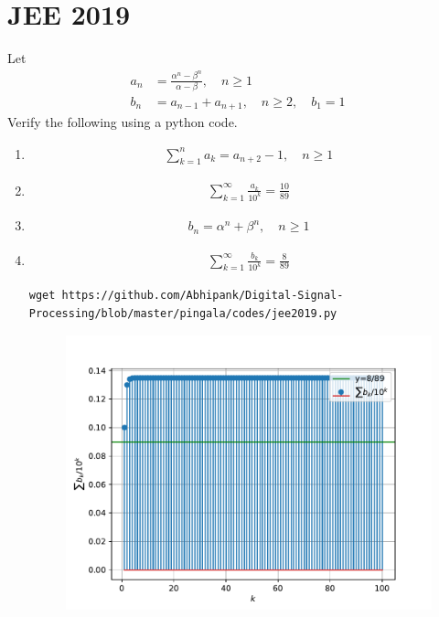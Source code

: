 \documentclass[journal,12pt,twocolumn]{IEEEtran}
\renewcommand\thesection{\arabic{section}}
\begin{document}
\section{JEE 2019}
Let 
\begin{align}
	a_n &= \frac{\alpha^{n}-\beta^{n}}{\alpha - \beta}, \quad n \ge 1
	\\
	b_n &= a_{n-1} + a_{n+1}, \quad n \ge 2, \quad b_1 =1
	\label{eq:10-orig-diff}
\end{align}
Verify the following using a python code.
\begin{enumerate}[label=\thesection.\arabic*
,ref=\thesection.\theenumi]
\item 
\begin{align}
	\sum_{k=1}^{n}a_k = a_{n+2}-1, \quad n \ge 1
\end{align}
 \item 
\begin{align}
	\sum_{k=1}^{\infty}\frac{a_k}{10^k} =\frac{10}{89}
\end{align}
 \item 
\begin{align}
	b_n =\alpha^n + \beta^n, \quad n \ge 1
\end{align}
 \item 
\begin{align}
	\sum_{k=1}^{\infty}\frac{b_k}{10^k} =\frac{8}{89}
\end{align}
\solution
\begin{lstlisting}
wget https://github.com/Abhipank/Digital-Signal-Processing/blob/master/pingala/codes/jee2019.py	
\end{lstlisting}
\begin{figure}[!ht]
	\begin{center}
	\includegraphics[width=\columnwidth]{./figs/proof1.4.pdf}
	\end{center}
	\label{fig:xnyn}	
	\end{figure}
\end{enumerate}
\end{document}
